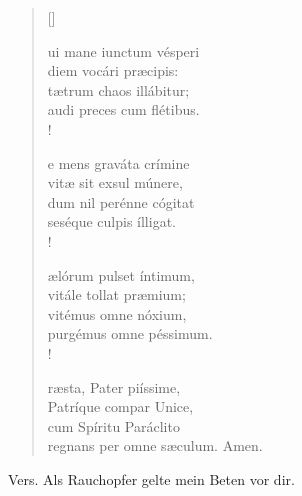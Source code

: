 \vspace{0.3cm}


\def\greinitialformat#1{{\fontsize{40}{40}\selectfont #1}}
\gresetfirstlineaboveinitial{\small \textcolor{red}{æstate}}{}
\setaboveinitialseparation{0.72mm}


\vspace{0.3cm}
\begin{verse}[\versewidth]
 

ui mane iunctum vésperi\\
diem vocári præcipis:\\
tætrum chaos illábitur;\\
audi preces cum flétibus.\\!

e mens graváta crímine\\
vitæ sit exsul múnere,\\ 
dum nil perénne cógitat\\
seséque culpis ílligat.\\!

ælórum pulset íntimum,\\
vitále tollat præmium;\\
vitémus omne nóxium,\\ 
purgémus omne péssimum.\\!

ræsta, Pater piíssime,\\ 
Patríque compar Unice,\\ 
cum Spíritu Paráclito\\
regnans per omne sæculum. Amen.


\end{verse}

\vspace{0.3cm}


Vers. Als Rauchopfer gelte mein Beten vor dir.



